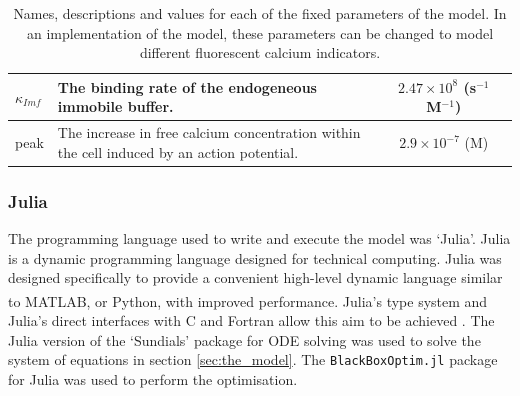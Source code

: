 \documentclass[a4paper,12pt]{article}
\theoremstyle{definition}
\begin{document}
\begin{table}[p]
\begin{tabular}{|l|p{6cm}|c|r|}
    $\kappa_{Imf}$& The binding rate of the endogeneous immobile buffer.                    & $2.47\times10^8$ (s$^{-1}$M$^{-1}$)         & \cite{bartol}   \\  \hline
    peak          & The increase in free calcium concentration within the cell induced by an action potential.  & $2.9\times10^{-7}$ (M)  & \cite{maravall} \\  \hline
  \end{tabular}
  \caption{Names, descriptions and values for each of the fixed parameters of the model. In an implementation of the model, these parameters can be changed to model different fluorescent calcium indicators.}
  \label{tab:fixed_params}
\end{table}

\subsubsection{Julia}
The programming language used to write and execute the model was `Julia'. Julia is a dynamic programming language designed for technical computing. Julia was designed specifically to provide a convenient high-level dynamic language similar to MATLAB\textsuperscript{\textregistered}, or Python, with improved performance. Julia's type system and Julia's direct interfaces with C and Fortran allow this aim to be achieved \cite{bezanson}. The Julia version of the `Sundials' package for ODE solving was used to solve the system of equations in section \ref{sec:the_model}. The \texttt{BlackBoxOptim.jl} package for Julia was used to perform the optimisation.
\end{document}
